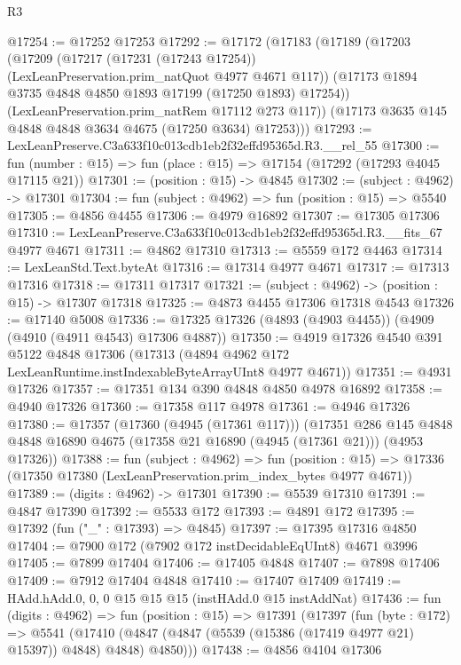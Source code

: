 \begin{lexlean}{R3}
\begin{coremodule}
@17254 := @17252 @17253
@17292 := @17172
    (@17183
      (@17189
        (@17203
          (@17209
            (@17217 (@17231 (@17243 @17254)) (LexLeanPreservation.prim_natQuot @4977 @4671 @117))
            (@17173 @1894 @3735 @4848 @4850 @1893 @17199 (@17250 @1893) @17254))
          (LexLeanPreservation.prim_natRem @17112 @273 @117))
        (@17173 @3635 @145 @4848 @4848 @3634 @4675 (@17250 @3634) @17253)))
@17293 := LexLeanPreserve.C3a633f10c013cdb1eb2f32effd95365d.R3.__rel_55
@17300 := fun (number : @15) => fun (place : @15) => @17154 (@17292 (@17293 @4045 @17115 @21))
@17301 := (position : @15) -> @4845
@17302 := (subject : @4962) -> @17301
@17304 := fun (subject : @4962) => fun (position : @15) => @5540
@17305 := @4856 @4455
@17306 := @4979 @16892
@17307 := @17305 @17306
@17310 := LexLeanPreserve.C3a633f10c013cdb1eb2f32effd95365d.R3.__fits_67 @4977 @4671
@17311 := @4862 @17310
@17313 := @5559 @172 @4463
@17314 := LexLeanStd.Text.byteAt
@17316 := @17314 @4977 @4671
@17317 := @17313 @17316
@17318 := @17311 @17317
@17321 := (subject : @4962) -> (position : @15) -> @17307 @17318
@17325 := @4873 @4455 @17306 @17318 @4543
@17326 := @17140 @5008
@17336 := @17325 @17326 (@4893 (@4903 @4455)) (@4909 (@4910 (@4911 @4543) @17306 @4887))
@17350 := @4919
    @17326
    @4540
    @391
    @5122
    @4848
    @17306
    (@17313 (@4894 @4962 @172 LexLeanRuntime.instIndexableByteArrayUInt8 @4977 @4671))
@17351 := @4931 @17326
@17357 := @17351 @134 @390 @4848 @4850 @4978 @16892
@17358 := @4940 @17326
@17360 := @17358 @117 @4978
@17361 := @4946 @17326
@17380 := @17357
    (@17360 (@4945 (@17361 @117)))
    (@17351
      @286
      @145
      @4848
      @4848
      @16890
      @4675
      (@17358 @21 @16890 (@4945 (@17361 @21)))
      (@4953 @17326))
@17388 := fun (subject : @4962) =>
  fun (position : @15) => @17336 (@17350 @17380 (LexLeanPreservation.prim_index_bytes @4977 @4671))
@17389 := (digits : @4962) -> @17301
@17390 := @5539 @17310
@17391 := @4847 @17390
@17392 := @5533 @172
@17393 := @4891 @172
@17395 := @17392 (fun ("_" : @17393) => @4845)
@17397 := @17395 @17316 @4850
@17404 := @7900 @172 (@7902 @172 instDecidableEqUInt8) @4671 @3996
@17405 := @7899 @17404
@17406 := @17405 @4848
@17407 := @7898 @17406
@17409 := @7912 @17404 @4848
@17410 := @17407 @17409
@17419 := HAdd.hAdd.{0, 0, 0} @15 @15 @15 (instHAdd.{0} @15 instAddNat)
@17436 := fun (digits : @4962) =>
  fun (position : @15) =>
  @17391
    (@17397
      (fun (byte : @172) =>
      @5541 (@17410 (@4847 (@4847 (@5539 (@15386 (@17419 @4977 @21) @15397)) @4848) @4848) @4850)))
@17438 := @4856 @4104 @17306

\end{coremodule}
\end{lexlean}
